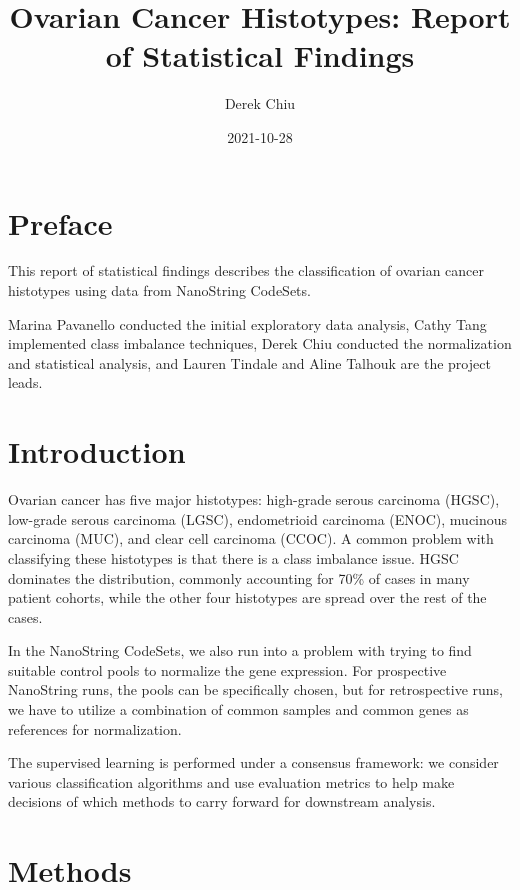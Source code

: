 \documentclass[
]{report}
\title{Ovarian Cancer Histotypes: Report of Statistical Findings}
\author{Derek Chiu}
\date{2021-10-28}
\begin{document}
\maketitle

{
\hypersetup{linkcolor=}
\setcounter{tocdepth}{1}
\tableofcontents
}
\listoffigures
\listoftables
\hypertarget{preface}{%
\chapter*{Preface}\label{preface}}

This report of statistical findings describes the classification of ovarian cancer histotypes using data from NanoString CodeSets.

Marina Pavanello conducted the initial exploratory data analysis, Cathy Tang implemented class imbalance techniques, Derek Chiu conducted the normalization and statistical analysis, and Lauren Tindale and Aline Talhouk are the project leads.

\hypertarget{introduction}{%
\chapter{Introduction}\label{introduction}}

Ovarian cancer has five major histotypes: high-grade serous carcinoma (HGSC), low-grade serous carcinoma (LGSC), endometrioid carcinoma (ENOC), mucinous carcinoma (MUC), and clear cell carcinoma (CCOC). A common problem with classifying these histotypes is that there is a class imbalance issue. HGSC dominates the distribution, commonly accounting for 70\% of cases in many patient cohorts, while the other four histotypes are spread over the rest of the cases.

In the NanoString CodeSets, we also run into a problem with trying to find suitable control pools to normalize the gene expression. For prospective NanoString runs, the pools can be specifically chosen, but for retrospective runs, we have to utilize a combination of common samples and common genes as references for normalization.

The supervised learning is performed under a consensus framework: we consider various classification algorithms and use evaluation metrics to help make decisions of which methods to carry forward for downstream analysis.

\hypertarget{methods}{%
\chapter{Methods}\label{methods}}
\end{document}
